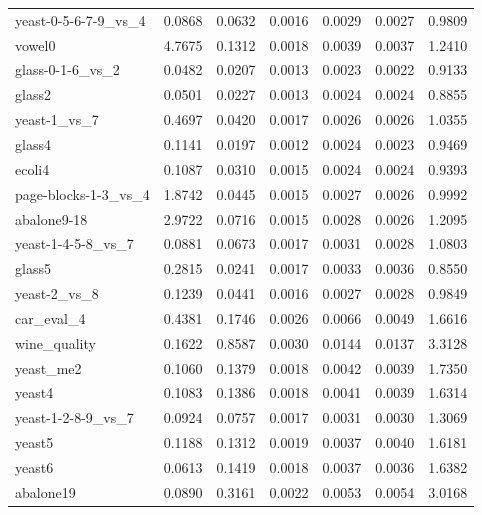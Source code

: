 \begin{table}[htbp]
{\begin{tabular}{lcccccc}
			yeast-0-5-6-7-9\_vs\_4 & 0.0868 & 0.0632 & 0.0016 & 0.0029 & 0.0027 & 0.9809 \\
			vowel0 & 4.7675 & 0.1312 & 0.0018 & 0.0039 & 0.0037 & 1.2410 \\
			glass-0-1-6\_vs\_2 & 0.0482 & 0.0207 & 0.0013 & 0.0023 & 0.0022 & 0.9133 \\
			glass2 & 0.0501 & 0.0227 & 0.0013 & 0.0024 & 0.0024 & 0.8855 \\
			yeast-1\_vs\_7 & 0.4697 & 0.0420 & 0.0017 & 0.0026 & 0.0026 & 1.0355 \\
			glass4 & 0.1141 & 0.0197 & 0.0012 & 0.0024 & 0.0023 & 0.9469 \\
			ecoli4 & 0.1087 & 0.0310 & 0.0015 & 0.0024 & 0.0024 & 0.9393 \\
			page-blocks-1-3\_vs\_4 & 1.8742 & 0.0445 & 0.0015 & 0.0027 & 0.0026 & 0.9992 \\
			abalone9-18 & 2.9722 & 0.0716 & 0.0015 & 0.0028 & 0.0026 & 1.2095 \\
			yeast-1-4-5-8\_vs\_7 & 0.0881 & 0.0673 & 0.0017 & 0.0031 & 0.0028 & 1.0803 \\
			glass5 & 0.2815 & 0.0241 & 0.0017 & 0.0033 & 0.0036 & 0.8550 \\
			yeast-2\_vs\_8 & 0.1239 & 0.0441 & 0.0016 & 0.0027 & 0.0028 & 0.9849 \\
			car\_eval\_4 & 0.4381 & 0.1746 & 0.0026 & 0.0066 & 0.0049 & 1.6616 \\
			wine\_quality & 0.1622 & 0.8587 & 0.0030 & 0.0144 & 0.0137 & 3.3128 \\
			yeast\_me2 & 0.1060 & 0.1379 & 0.0018 & 0.0042 & 0.0039 & 1.7350 \\
			yeast4 & 0.1083 & 0.1386 & 0.0018 & 0.0041 & 0.0039 & 1.6314 \\
			yeast-1-2-8-9\_vs\_7 & 0.0924 & 0.0757 & 0.0017 & 0.0031 & 0.0030 & 1.3069 \\
			yeast5 & 0.1188 & 0.1312 & 0.0019 & 0.0037 & 0.0040 & 1.6181 \\
			yeast6 & 0.0613 & 0.1419 & 0.0018 & 0.0037 & 0.0036 & 1.6382 \\
			abalone19 & 0.0890 & 0.3161 & 0.0022 & 0.0053 & 0.0054 & 3.0168 \\
			\bottomrule
		\end{tabular}%
		
	}
	\label{tab:ProcessingTime}%
\end{table}%






